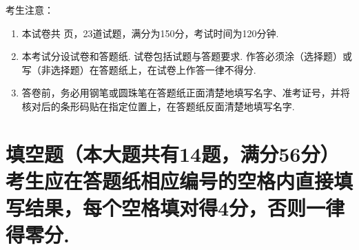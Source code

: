 \documentclass[12pt,space]{ctexart} %
\begin{document}
\juemi%
{\heiti 考生注意：}
\begin{enumerate}[itemsep=-0.3em,topsep=0pt]
\item 本试卷共 \pageref{LastPage} 页，23道试题，满分为150分，考试时间为120分钟.
\item 本考试分设试卷和答题纸. 试卷包括试题与答题要求. 作答必须涂（选择题）或写（非选择题）在答题纸上，在试卷上作答一律不得分.
\item 答卷前，务必用钢笔或圆珠笔在答题纸正面清楚地填写名字、准考证号，并将核对后的条形码贴在指定位置上，在答题纸反面清楚地填写名字.
\end{enumerate}

\section{填空题（本大题共有14题，满分56分）考生应在答题纸相应编号的空格内直接填写结果，每个空格填对得4分，否则一律得零分.}
\end{document}
